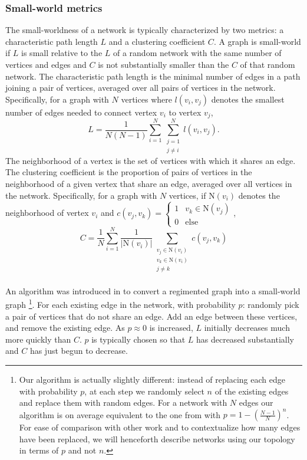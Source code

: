 \documentclass[format=sigconf]{acmart}
\newcommand{\npar}{\\\indent}
\begin{document}
\subsubsection{Small-world metrics}
The small-worldness of a network is typically characterized by two metrics: a characteristic path length $L$ and a clustering coefficient $C$. A graph is small-world if $L$ is small relative to the $L$ of a random network with the same number of vertices and edges and $C$ is not substantially smaller than the $C$ of that random network. The characteristic path length is the minimal number of edges in a path joining a pair of vertices, averaged over all pairs of vertices in the network. Specifically, for a graph with $N$ vertices where $l(v_i,v_j)$ denotes the smallest number of edges needed to connect vertex $v_i$ to vertex $v_j$, 
\begin{equation}
\label{eqn:charpathlength}
L=\frac{1}{N(N-1)}\sum_{i=1}^{N}\sum_{\substack{j=1\\j\neq i}}^{N}l(v_i,v_j).
\end{equation}
The neighborhood of a vertex is the set of vertices with which it shares an edge. The clustering coefficient is the proportion of pairs of vertices in the neighborhood of a given vertex that share an edge, averaged over all vertices in the network. Specifically, for a graph with $N$ vertices, if $\text{N}(v_i)$ denotes the neighborhood of vertex $v_i$ and $c(v_j,v_k)=\begin{cases}1 & v_k\in\text{N}(v_j)\\0 & \text{else}\end{cases}$,
\begin{equation}
\label{eqn:clustcoeff}
C=\frac{1}{N}\sum_{i=1}^{N}\frac{1}{|\text{N}(v_i)|}\sum_{\substack{v_j\in \text{N}(v_i)\\v_k\in\text{N}(v_i)\\j\neq k}}c(v_j,v_k)
\end{equation}
\npar
An algorithm was introduced in \cite{watts98} to convert a regimented graph into a small-world graph
\footnote{Our algorithm is actually slightly different: instead of replacing each edge with probability $p$, at each step we randomly select $n$ of the existing edges and replace them with random edges. For a network with $N$ edges our algorithm is on average equivalent to the one from \cite{watts98} with $p=1-(\frac{N-1}{N})^n$. For ease of comparison with other work and to contextualize how many edges have been replaced, we will henceforth describe networks using our topology in terms of $p$ and not $n$.}.
 For each existing edge in the network, with probability $p$: randomly pick a pair of vertices that do not share an edge. Add an edge between these vertices, and remove the existing edge. As $p\approx 0$ is increased, $L$ initially decreases much more quickly than $C$. $p$ is typically chosen so that $L$ has decreased substantially and $C$ has just begun to decrease.
\end{document}
